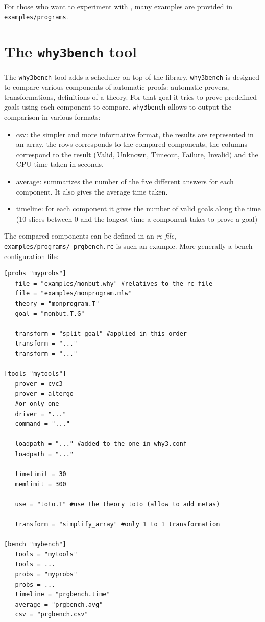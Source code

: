 For those who want to experiment with \whyml, many examples are provided in
\texttt{examples/programs}.

\section{The \texttt{why3bench} tool}

The \texttt{why3bench} tool adds a scheduler on top of the \why
library. \texttt{why3bench} is designed to compare various components
of automatic proofs: automatic provers, transformations, definitions
of a theory. For that goal it tries to prove predefined goals using
each component to compare. \texttt{why3bench} allows to output the
comparison in various formats:
\begin{itemize}
\item csv: the simpler and more informative format, the results are
  represented in an array, the rows corresponds to the
  compared components, the columns correspond to the result
  (Valid, Unknown, Timeout, Failure, Invalid) and the CPU time taken in seconds.
\item average: summarizes the number of the five different answers
  for each component. It also gives the average time taken.
\item timeline: for each component it gives the number of valid goals
  along the time (10 slices between 0 and the longest time a component
  takes to prove a goal)
\end{itemize}

The compared components can be defined in an \emph{rc-file},
\texttt{examples/programs/\ prgbench.rc} is such an example. More
generally a bench configuration file:
\begin{verbatim}
[probs "myprobs"]
   file = "examples/monbut.why" #relatives to the rc file
   file = "examples/monprogram.mlw"
   theory = "monprogram.T"
   goal = "monbut.T.G"

   transform = "split_goal" #applied in this order
   transform = "..."
   transform = "..."

[tools "mytools"]
   prover = cvc3
   prover = altergo
   #or only one
   driver = "..."
   command = "..."

   loadpath = "..." #added to the one in why3.conf
   loadpath = "..."

   timelimit = 30
   memlimit = 300

   use = "toto.T" #use the theory toto (allow to add metas)

   transform = "simplify_array" #only 1 to 1 transformation

[bench "mybench"]
   tools = "mytools"
   tools = ...
   probs = "myprobs"
   probs = ...
   timeline = "prgbench.time"
   average = "prgbench.avg"
   csv = "prgbench.csv"
\end{verbatim}

